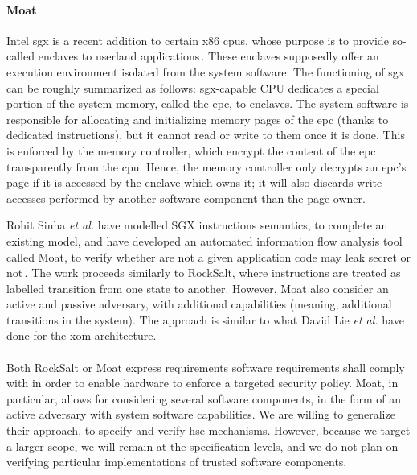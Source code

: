 \paragraph{Moat}
%
Intel \ac{sgx} is a recent addition to certain x86 \acp{cpu}, whose purpose is
to provide so-called enclaves to userland
applications\,\cite{costan2016sgxexplained}.
%
These enclaves supposedly offer an execution environment isolated from the
system software.
%
The functioning of \ac{sgx} can be roughly summarized as follows:
\ac{sgx}-capable CPU dedicates a special portion of the system memory, called
the \ac{epc}, to enclaves.
%
The system software is responsible for allocating and initializing memory pages
of the \ac{epc} (thanks to dedicated instructions), but it cannot read or write
to them once it is done.
%
This is enforced by the memory controller, which encrypt the content of the
\ac{epc} transparently from the \ac{cpu}.
%
Hence, the memory controller only decrypts an \ac{epc}'s page if it is accessed
by the enclave which owns it; it will also discards write accesses performed by
another software component than the page owner.

Rohit Sinha \emph{et al.} have modelled SGX instructions semantics, to complete
an existing model, and have developed an automated information flow analysis
tool called Moat, to verify whether are not a given application code may leak
secret or not\,\cite{sinha2015moat}.
%
The work proceeds similarly to RockSalt, where instructions are treated as
labelled transition from one state to another.
%
However, Moat also consider an active and passive adversary, with additional
capabilities (meaning, additional transitions in the system).
%
The approach is similar to what David Lie \emph{et al.} have done for the
\ac{xom} architecture.

\paragraph{}
%
Both RockSalt or Moat express requirements software requirements shall comply
with in order to enable hardware to enforce a targeted security policy.
%
Moat, in particular, allows for considering several software components, in the
form of an active adversary with system software capabilities.
%
We are willing to generalize their approach, to specify and verify \ac{hse}
mechanisms.
%
However, because we target a larger scope, we will remain at the specification
levels, and we do not plan on verifying particular implementations of trusted
software components.

